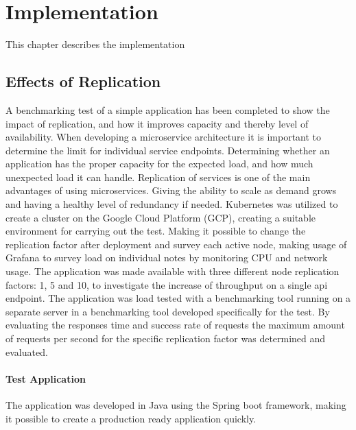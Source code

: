 \chapter{Implementation}

This chapter describes the implementation



\section{Effects of Replication}
A benchmarking test of a simple application has been completed to show the impact of replication, and how it improves capacity and thereby level of availability. When developing a microservice architecture it is important to determine the limit for individual service endpoints. Determining whether an application has the proper capacity for the expected load, and how much unexpected load it can handle. Replication of services is one of the main advantages of using microservices. Giving the ability to scale as demand grows and having a healthy level of redundancy if needed. 
Kubernetes was utilized to create a cluster on the Google Cloud Platform (GCP), creating a suitable environment for carrying out the test. Making it possible to change the replication factor after deployment and survey each active node, making usage of Grafana to survey load on individual notes by monitoring CPU and network usage. The application was made available with three different node replication factors: 1,  5 and 10, to investigate the increase of throughput on a single api endpoint. 
The application was load tested with a benchmarking tool running on a separate server in a benchmarking tool developed specifically for the test. By evaluating the responses time and success rate of requests the maximum amount of requests per second for the specific replication factor was determined and evaluated.


\subsubsection{Test Application}
The application was developed in Java using the Spring boot framework, making it possible to create a production ready application quickly. 

